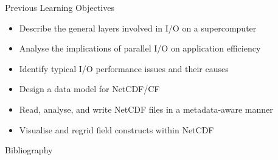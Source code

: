 \documentclass[compress,11pt,xcolor=svgnames,aspectratio=169]{beamer}
\begin{document}
\begin{frame}[fragile]{Previous Learning Objectives}

\begin{itemize}

    \item Describe the general layers involved in I/O on a supercomputer
    \item Analyse the implications of parallel I/O on application efficiency
    \item Identify typical I/O performance issues and their causes
    \item Design a data model for NetCDF/CF
    \item Read, analyse, and write NetCDF files in a metadata-aware manner
    \item Visualise and regrid field constructs within NetCDF

\end{itemize}

\end{frame}

\begin{frame}[allowframebreaks]{Bibliography}

{

\tiny




}

\end{frame}

\acknowledgement
\end{document}
